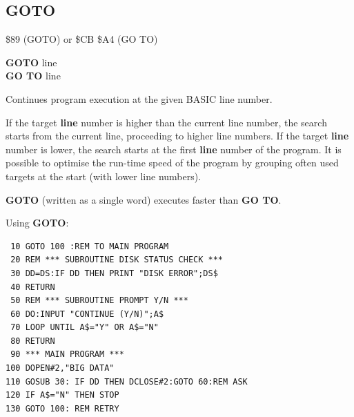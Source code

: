 
\newpage
\subsection{GOTO}
\begin{description}[leftmargin=2cm,style=nextline]
\item [Token:] \$89 (GOTO) or \$CB \$A4 (GO TO)
\item [Format:] {\bf GOTO} line \\
                {\bf GO TO} line
\item [Usage:] Continues program
               execution at the given BASIC line number.

\item [Remarks:] If the target {\bf line} number is higher than the current line number, the
               search starts from the current line, proceeding to higher line numbers.
               If the target {\bf line} number is lower, the search starts
               at the first {\bf line} number of the program.
               It is possible to optimise
               the run-time speed of the program by grouping often used targets at the
               start (with lower line numbers).

               {\bf GOTO} (written as a single word) executes faster than {\bf GO TO}.

\item [Example:] Using {\bf GOTO}:
\begin{tcolorbox}[colback=black,coltext=white]
\verbatimfont{\codefont}
\begin{verbatim}
 10 GOTO 100 :REM TO MAIN PROGRAM
 20 REM *** SUBROUTINE DISK STATUS CHECK ***
 30 DD=DS:IF DD THEN PRINT "DISK ERROR";DS$
 40 RETURN
 50 REM *** SUBROUTINE PROMPT Y/N ***
 60 DO:INPUT "CONTINUE (Y/N)";A$
 70 LOOP UNTIL A$="Y" OR A$="N"
 80 RETURN
 90 *** MAIN PROGRAM ***
100 DOPEN#2,"BIG DATA"
110 GOSUB 30: IF DD THEN DCLOSE#2:GOTO 60:REM ASK
120 IF A$="N" THEN STOP
130 GOTO 100: REM RETRY
\end{verbatim}
\end{tcolorbox}
\end{description}


\newpage
